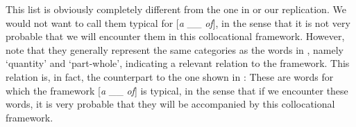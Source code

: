 \begin{table}
\caption{The collocational framework [\textit{a} \_\_ \textit{of}] in the BNC by percentage of occurrences}
\label{tab:axofpercent}
\end{table}

This list is obviously completely different from the one in \citet{renouf_collocational_1991} or our replication.  We would not want to call them typical for [\textit{a} \_\_ \textit{of}], in the sense that it is not very probable that we will encounter them in this collocational  framework.  However, note that they generally represent the same categories as the words in , namely `quantity' and `part\hyp{}whole', indicating a relevant relation to the framework. This relation is, in fact, the counterpart to the one shown in : These are words for which the framework [\textit{a} \_\_ \textit{of}] is typical, in the sense that if we encounter these words, it is very probable that they will be accompanied by this collocational  framework.

